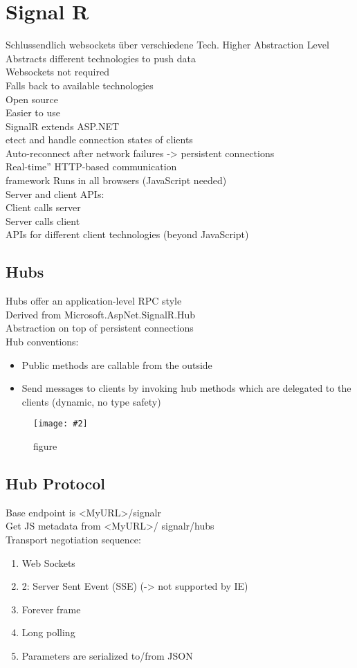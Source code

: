 \documentclass[a4paper,10pt]{scrreprt}
\newcommand{\pic}[2][figure]{\begin{figure}[h]
 \centering
 \texttt{[image: \#2]}
 \caption{#1}
\end{figure}
}
\begin{document}
\chapter{Signal R}
Schlussendlich websockets über verschiedene Tech.
Higher Abstraction Level\\
Abstracts different technologies to push data\\
Websockets not required\\
Falls back to available technologies\\
Open source\\
Easier to use\\
SignalR extends ASP.NET\\
etect and handle connection states of
clients\\
Auto-reconnect after network failures ->
persistent connections\\Real-time” HTTP-based communication\\
framework
Runs in all browsers (JavaScript needed) \\
Server and client APIs:\\
 Client calls server\\
 Server calls client\\
 APIs for different client technologies (beyond
JavaScript)\\

\section{Hubs}
Hubs offer an application-level RPC style\\
Derived from
Microsoft.AspNet.SignalR.Hub\\
Abstraction on top of persistent connections\\
Hub conventions:
\begin{itemize}
\item Public methods are callable from the outside
\item  Send messages to clients by invoking hub
methods which are delegated to the clients
(dynamic, no type safety)
\end{itemize}

\pic{sighub.png}

\section{Hub Protocol}
Base endpoint is <MyURL>/signalr\\
Get JS metadata from <MyURL>/ signalr/hubs\\
Transport negotiation sequence:\\
\begin{enumerate}
\item Web Sockets
\item  2: Server Sent Event (SSE) (-> not supported by IE)
\item Forever frame
\item Long polling
\item Parameters are serialized to/from JSON
\end{enumerate}
\end{document}
